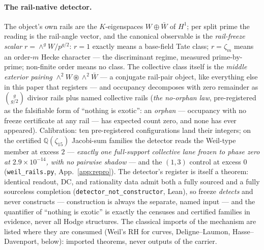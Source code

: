 \documentclass[11pt]{article}
\theoremstyle{definition}
\theoremstyle{remark}
\begin{document}
\paragraph{The rail-native detector.} The object's own rails are the
$K$-eigenspaces $W\oplus\bar W$ of $H^1$; per split prime the reading is
the rail-angle vector, and the canonical observable is the
\emph{rail-freeze scalar} $r=\wedge^{g}W/p^{g/2}$: $r=1$ exactly means a
base-field Tate class; $r=\zeta_m$ means an order-$m$ Hecke character ---
the discriminant regime, measured prime-by-prime; non-finite order means no
class. The collective class itself is the \emph{middle exterior pairing}
$\wedge^2W\circledast\wedge^2\bar W$ --- a conjugate rail-pair object, like
everything else in this paper that registers --- and occupancy decomposes
with zero remainder as $\binom{g}{g/2}$ divisor rails plus named collective
rails (\emph{the no-orphan law}, pre-registered as the falsifiable form of
``nothing is exotic'': an \emph{orphan} --- occupancy with no freeze
certificate at any rail --- has expected count zero, and none has ever
appeared). Calibration: ten pre-registered configurations land their
integers; on the certified $\mathbb Q(\zeta_{15})$ Jacobi-sum families the
detector reads the Weil-type member at excess $2$ --- \emph{exactly one
full-support collective lane frozen to phase zero at $2.9\times10^{-14}$,
with no pairwise shadow} --- and the $(1,3)$ control at excess $0$
(\texttt{weil\_rails.py}, App.~\ref{app:repro}). The detector's register is
itself a theorem: identical readout, DC, and rationality data admit both a
fully sourced and a fully sourceless completion
(\texttt{detector\_not\_constructor}, Lean), so freeze \emph{detects} and
never constructs --- construction is always the separate, named input --- and
the quantifier of ``nothing is exotic'' is exactly the censuses and certified
families in evidence, never all Hodge structures. The classical imports of
the mechanism are listed where they are consumed (Weil's RH for curves,
Deligne--Laumon, Hasse--Davenport, below): imported theorems, never outputs
of the carrier.
\end{document}
